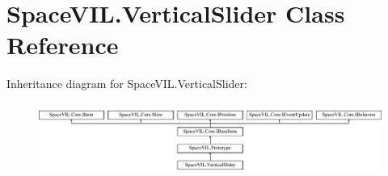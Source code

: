 \hypertarget{class_space_v_i_l_1_1_vertical_slider}{}\section{Space\+V\+I\+L.\+Vertical\+Slider Class Reference}
\label{class_space_v_i_l_1_1_vertical_slider}
Inheritance diagram for Space\+V\+I\+L.\+Vertical\+Slider\+:\begin{figure}[H]
\begin{center}
\leavevmode
\includegraphics[height=2.421622cm]{class_space_v_i_l_1_1_vertical_slider}
\end{center}
\end{figure}
